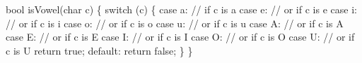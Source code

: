 \documentclass[
  letterpaper,
  DIV=11,
  numbers=noendperiod]{scrreprt}
\newenvironment{Shaded}{\begin{snugshade}}{\end{snugshade}}
\newcommand{\ControlFlowTok}[1]{\textcolor[rgb]{0.00,0.23,0.31}{#1}}
\newcommand{\ErrorTok}[1]{\textcolor[rgb]{0.68,0.00,0.00}{#1}}
\newcommand{\FunctionTok}[1]{\textcolor[rgb]{0.28,0.35,0.67}{#1}}
\newcommand{\NormalTok}[1]{\textcolor[rgb]{0.00,0.23,0.31}{#1}}
\newcommand{\SpecialCharTok}[1]{\textcolor[rgb]{0.37,0.37,0.37}{#1}}
\newcommand{\StringTok}[1]{\textcolor[rgb]{0.13,0.47,0.30}{#1}}
\begin{document}
\begin{Shaded}
\begin{Highlighting}[]
\NormalTok{bool }\FunctionTok{isVowel}\NormalTok{(char c)}
\NormalTok{\{}
    \ControlFlowTok{switch}\NormalTok{ (c)}
\NormalTok{    \{}
\NormalTok{        case }\StringTok{\textquotesingle{}a\textquotesingle{}}\SpecialCharTok{:} \ErrorTok{//} \ControlFlowTok{if}\NormalTok{ c is }\StringTok{\textquotesingle{}a\textquotesingle{}}
\NormalTok{        case }\StringTok{\textquotesingle{}e\textquotesingle{}}\SpecialCharTok{:} \ErrorTok{//}\NormalTok{ or }\ControlFlowTok{if}\NormalTok{ c is }\StringTok{\textquotesingle{}e\textquotesingle{}}
\NormalTok{        case }\StringTok{\textquotesingle{}i\textquotesingle{}}\SpecialCharTok{:} \ErrorTok{//}\NormalTok{ or }\ControlFlowTok{if}\NormalTok{ c is }\StringTok{\textquotesingle{}i\textquotesingle{}}
\NormalTok{        case }\StringTok{\textquotesingle{}o\textquotesingle{}}\SpecialCharTok{:} \ErrorTok{//}\NormalTok{ or }\ControlFlowTok{if}\NormalTok{ c is }\StringTok{\textquotesingle{}o\textquotesingle{}}
\NormalTok{        case }\StringTok{\textquotesingle{}u\textquotesingle{}}\SpecialCharTok{:} \ErrorTok{//}\NormalTok{ or }\ControlFlowTok{if}\NormalTok{ c is }\StringTok{\textquotesingle{}u\textquotesingle{}}
\NormalTok{        case }\StringTok{\textquotesingle{}A\textquotesingle{}}\SpecialCharTok{:} \ErrorTok{//}\NormalTok{ or }\ControlFlowTok{if}\NormalTok{ c is }\StringTok{\textquotesingle{}A\textquotesingle{}}
\NormalTok{        case }\StringTok{\textquotesingle{}E\textquotesingle{}}\SpecialCharTok{:} \ErrorTok{//}\NormalTok{ or }\ControlFlowTok{if}\NormalTok{ c is }\StringTok{\textquotesingle{}E\textquotesingle{}}
\NormalTok{        case }\StringTok{\textquotesingle{}I\textquotesingle{}}\SpecialCharTok{:} \ErrorTok{//}\NormalTok{ or }\ControlFlowTok{if}\NormalTok{ c is }\StringTok{\textquotesingle{}I\textquotesingle{}}
\NormalTok{        case }\StringTok{\textquotesingle{}O\textquotesingle{}}\SpecialCharTok{:} \ErrorTok{//}\NormalTok{ or }\ControlFlowTok{if}\NormalTok{ c is }\StringTok{\textquotesingle{}O\textquotesingle{}}
\NormalTok{        case }\StringTok{\textquotesingle{}U\textquotesingle{}}\SpecialCharTok{:} \ErrorTok{//}\NormalTok{ or }\ControlFlowTok{if}\NormalTok{ c is }\StringTok{\textquotesingle{}U\textquotesingle{}}
\NormalTok{            return true;}
\NormalTok{        default}\SpecialCharTok{:}
\NormalTok{            return false;}
\NormalTok{    \}}
\NormalTok{\}}
\end{Highlighting}
\end{Shaded}
\end{document}

